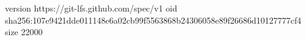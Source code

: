 version https://git-lfs.github.com/spec/v1
oid sha256:107e9421dde011148e6a02cb99f5563868b24306058e89f26686d10127777cf4
size 22000
